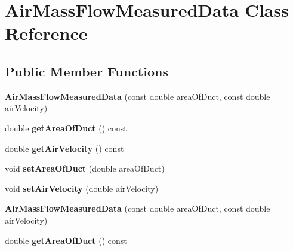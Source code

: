 \hypertarget{class_air_mass_flow_measured_data}{}\section{Air\+Mass\+Flow\+Measured\+Data Class Reference}
\label{class_air_mass_flow_measured_data}
\subsection*{Public Member Functions}
\begin{DoxyCompactItemize}
\item 
\mbox{\label{class_air_mass_flow_measured_data_af2689f6331303c77fbba7d58ea172d56}} 
{\bfseries Air\+Mass\+Flow\+Measured\+Data} (const double area\+Of\+Duct, const double air\+Velocity)
\item 
\mbox{\label{class_air_mass_flow_measured_data_af1087dd51550483665405e70de95cd2b}} 
double {\bfseries get\+Area\+Of\+Duct} () const
\item 
\mbox{\label{class_air_mass_flow_measured_data_a11b1123e2339a9c54d91ca6bfe07b24f}} 
double {\bfseries get\+Air\+Velocity} () const
\item 
\mbox{\label{class_air_mass_flow_measured_data_a1720b401f48d2964014031dc05adca44}} 
void {\bfseries set\+Area\+Of\+Duct} (double area\+Of\+Duct)
\item 
\mbox{\label{class_air_mass_flow_measured_data_a3faf07853d690a6ef6475279bf9992e5}} 
void {\bfseries set\+Air\+Velocity} (double air\+Velocity)
\item 
\mbox{\label{class_air_mass_flow_measured_data_af2689f6331303c77fbba7d58ea172d56}} 
{\bfseries Air\+Mass\+Flow\+Measured\+Data} (const double area\+Of\+Duct, const double air\+Velocity)
\item 
\mbox{\label{class_air_mass_flow_measured_data_af1087dd51550483665405e70de95cd2b}} 
double {\bfseries get\+Area\+Of\+Duct} () const
\item 

\end{DoxyCompactItemize}
